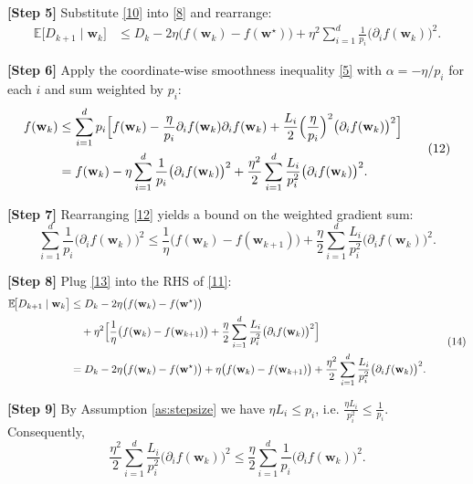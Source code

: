 \documentclass{article}
\newcommand{\E}{\mathbb{E}}
\newcommand{\w}{\mathbf{w}}
\begin{document}
\noindent\textbf{[Step 5]} Substitute \eqref{10} into \eqref{8} and rearrange:
\[
\begin{aligned}
\E\!\bigl[D_{k+1}\mid\w_{k}\bigr]
&\le D_{k}
   -2\eta\bigl(f(\w_{k})-f(\w^{\star})\bigr)
   +\eta^{2}\sum_{i=1}^{d}\frac{1}{p_{i}}\bigl(\partial_{i}f(\w_{k})\bigr)^{2}.
\end{aligned}
\tag{11}
\]

\noindent\textbf{[Step 6]} Apply the coordinate‑wise smoothness inequality \eqref{5} with
$\alpha=-\eta/p_{i}$ for each $i$ and sum weighted by $p_{i}$:
\[
\begin{aligned}
f(\w_{k}) 
&\le \sum_{i=1}^{d}p_{i}\Bigl[
      f(\w_{k})-\frac{\eta}{p_{i}}\partial_{i}f(\w_{k})\partial_{i}f(\w_{k})
      +\frac{L_{i}}{2}\Bigl(\frac{\eta}{p_{i}}\Bigr)^{2}
      \bigl(\partial_{i}f(\w_{k})\bigr)^{2}
      \Bigr]   \\
&= f(\w_{k})-\eta\sum_{i=1}^{d}\frac{1}{p_{i}}\bigl(\partial_{i}f(\w_{k})\bigr)^{2}
   +\frac{\eta^{2}}{2}\sum_{i=1}^{d}\frac{L_{i}}{p_{i}^{2}}
      \bigl(\partial_{i}f(\w_{k})\bigr)^{2}.
\end{aligned}
\tag{12}
\]

\noindent\textbf{[Step 7]} Rearranging \eqref{12} yields a bound on the weighted gradient sum:
\[
\sum_{i=1}^{d}\frac{1}{p_{i}}\bigl(\partial_{i}f(\w_{k})\bigr)^{2}
\le \frac{1}{\eta}\bigl(f(\w_{k})-f(\w_{k+1})\bigr)
   +\frac{\eta}{2}\sum_{i=1}^{d}\frac{L_{i}}{p_{i}^{2}}
      \bigl(\partial_{i}f(\w_{k})\bigr)^{2}.
\tag{13}
\]

\noindent\textbf{[Step 8]} Plug \eqref{13} into the RHS of \eqref{11}:
\[
\begin{aligned}
\E\!\bigl[D_{k+1}\mid\w_{k}\bigr]
&\le D_{k}
   -2\eta\bigl(f(\w_{k})-f(\w^{\star})\bigr) \\
&\quad +\eta^{2}\Bigl[
      \frac{1}{\eta}\bigl(f(\w_{k})-f(\w_{k+1})\bigr)
      +\frac{\eta}{2}\sum_{i=1}^{d}\frac{L_{i}}{p_{i}^{2}}
          \bigl(\partial_{i}f(\w_{k})\bigr)^{2}
      \Bigr] \\
&= D_{k}
   -2\eta\bigl(f(\w_{k})-f(\w^{\star})\bigr)
   +\eta\bigl(f(\w_{k})-f(\w_{k+1})\bigr)
   +\frac{\eta^{2}}{2}\sum_{i=1}^{d}\frac{L_{i}}{p_{i}^{2}}
          \bigl(\partial_{i}f(\w_{k})\bigr)^{2}.
\end{aligned}
\tag{14}
\]

\noindent\textbf{[Step 9]} By Assumption \ref{as:stepsize} we have $\eta L_{i}\le p_{i}$,
i.e. $\frac{\eta L_{i}}{p_{i}^{2}}\le\frac{1}{p_{i}}$. Consequently,
\[
\frac{\eta^{2}}{2}\sum_{i=1}^{d}\frac{L_{i}}{p_{i}^{2}}
          \bigl(\partial_{i}f(\w_{k})\bigr)^{2}
\le \frac{\eta}{2}\sum_{i=1}^{d}\frac{1}{p_{i}}
          \bigl(\partial_{i}f(\w_{k})\bigr)^{2}.
\tag{15}
\]
\end{document}
